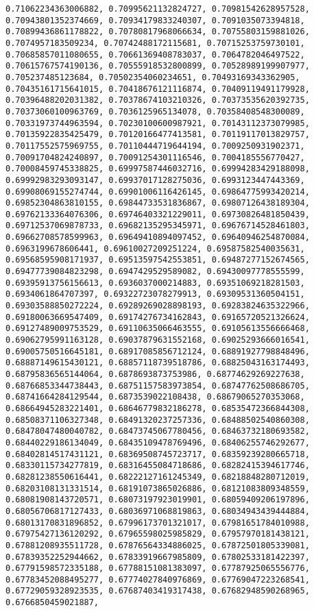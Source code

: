 \documentclass[11pt]{article}
\begin{document}
\begin{Verbatim}[commandchars=\\\{\}]
0.71062234363006882, 0.70995621132824727, 0.70981542628957528, 0.70943801352374669, 0.70934179833240307, 0.7091035073394818, 0.70899436861178822, 0.70780817968066634, 0.70755803159881026, 0.7074957183509234, 0.70742488172115681, 0.70715253759730101, 0.70685857011080655, 0.70661369408783037, 0.7064782046497522, 0.70615767574190136, 0.70555918532800899, 0.70528989199907977, 0.705237485123684, 0.70502354060234651, 0.70493169343362905, 0.70435161715641015, 0.70418676121116874, 0.70409119491179928, 0.70396488202031382, 0.70378674103210326, 0.70373535620392735, 0.70373060100963769, 0.7036125965134078, 0.70358408548300089, 0.70331973744963594, 0.70230100600987921, 0.70143112373079985, 0.70135922835425479, 0.70120166477413581, 0.70119117013829757, 0.70117552575969755, 0.70110444719644194, 0.7009250931902371, 0.70091704824240897, 0.70091254301116546, 0.7004185556770427, 0.70008459745338825, 0.69997587446032716, 0.69994283429188098, 0.69992983293093147, 0.69937017128275036, 0.6993123447443369, 0.69908069155274744, 0.69901006116426145, 0.69864775993420214, 0.69852304863810155, 0.69844733531836867, 0.69807126438189304, 0.69762133364076306, 0.69746403321229011, 0.69730826481850439, 0.69712537069878733, 0.69682135295345971, 0.69676714528461803, 0.69662708578599963, 0.69649410894097452, 0.69640946254870084, 0.6963199678606441, 0.69610027209251224, 0.69587582540035631, 0.69568595908171937, 0.69513597542553851, 0.69487277152674565, 0.69477739084823298, 0.6947429529589082, 0.69430097778555599, 0.69395913756156613, 0.6936037000214883, 0.69351069218281503, 0.6934061864707397, 0.69322723078279913, 0.69309531360504151, 0.69303588850272224, 0.69289269028898193, 0.69283824635322966, 0.69180063669547409, 0.69174276734162843, 0.69165720521326624, 0.69127489009753529, 0.69110635066463555, 0.69105613556666468, 0.69062795991163128, 0.69037879631552168, 0.69025293666016541, 0.69005750516645181, 0.68917085856712124, 0.68891927798848496, 0.68887149615430121, 0.68857118739518786, 0.68825043163174493, 0.68795836565144064, 0.6878693873753986, 0.68774629269227638, 0.68766853344738443, 0.68751157583973854, 0.68747762508686705, 0.68741664284129544, 0.6873539022108438, 0.68679065270353068, 0.68664945283221401, 0.68646779832186278, 0.68535472366844308, 0.68508371106327348, 0.68491320237257336, 0.68488502540860308, 0.68478047480040782, 0.68473745067780456, 0.68463732180693582, 0.68440229186134049, 0.68435109478769496, 0.68406255746292677, 0.68402814517431121, 0.68369508745723717, 0.68359239280665718, 0.68330115734277819, 0.68316455084718686, 0.68282415394617746, 0.68281238550616441, 0.68222127161245349, 0.68218848280712019, 0.68203108131331514, 0.68191073865026886, 0.68121083809348559, 0.68081908143720571, 0.68073197923019901, 0.68059409206197896, 0.68056706817127433, 0.68036971068819863, 0.68034943439444884, 0.68013170831896852, 0.67996173701321017, 0.67981651784010988, 0.67975427136120292, 0.67965598025985829, 0.67957970181438121, 0.67881208935511728, 0.67876564334886025, 0.67872501805339081, 0.67839352252944662, 0.67833919667985809, 0.67802533181422397, 0.67791598572335188, 0.67788151081383097, 0.67787925065556776, 0.67783452088495277, 0.67774027840976869, 0.67769047223268541, 0.67729059328923535, 0.67687403419317438, 0.67682948590268965, 0.6766850459021887, 
\end{Verbatim}
\end{document}
